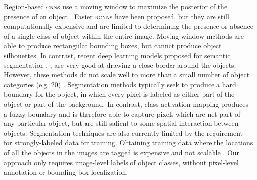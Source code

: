 Region-based \textsc{cnn}s use a moving window to maximize the posterior of the presence of an object \cite{xxx_girshick2015fast}.
Faster \textsc{rcnn}s \cite{xxx_ren2015faster} have been proposed, but they are still computationally expensive and are limited to determining the presence or absence of a single class of object within the entire image.
Moving-window methods are able to produce rectangular bounding boxes, but cannot produce object silhouettes.
In contrast, recent deep learning models proposed for semantic segmentation \cite{xxx_long2015fully}, \cite{xxx_girshick2014rich}, \cite{xxx_zheng2015conditional} are very good at drawing a close border around the objects.
However, these methods do not scale well to more than a small number of object categories (e.g. $20$) \cite{xxx_everingham2010pascal}.
Segmentation methods typically seek to produce a hard boundary for the object, in which every pixel is labeled as either part of the object or part of the background.
In contrast, class activation mapping produces a fuzzy boundary and is therefore able to capture pixels which are not part of any particular object, but are still salient to some spatial interaction between objects.
Segmentation techniques are also currently limited by the requirement for strongly-labeled data for training.
Obtaining training data where the locations of all the objects in the images are tagged is expensive and not scalable \cite{xxx_everingham2010pascal}. Our approach only requires image-level labels of object classes, without pixel-level annotation or bounding-box localization.

